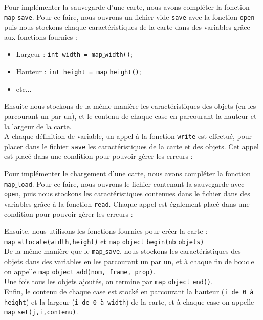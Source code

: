 \documentclass[a4paper, 12pt]{article}
\begin{document}
Pour implémenter la sauvegarde d'une carte, nous avons compléter la fonction \texttt{map$\_$save}.
Pour ce faire, nous ouvrons un fichier vide \texttt{save} avec la fonction \texttt{open} puis nous stockons chaque caractéristiques de la carte dans des variables grâce aux fonctions fournies :
\begin{itemize}
	\item Largeur : \texttt{int width = map$\_$width()};
	\item Hauteur : \texttt{int height = map$\_$height()};
	\item etc...
\end{itemize}
Ensuite nous stockons de la même manière les caractéristiques des objets (en les parcourant un par un), et le contenu de chaque case en parcourant la hauteur et la largeur de la carte. \\
A chaque définition de variable, un appel à la fonction \texttt{write} est effectué, pour placer dans le fichier \texttt{save} les caractéristiques de la carte et des objets. Cet appel est placé dans une condition pour pouvoir gérer les erreurs :
 

Pour implémenter le chargement d'une carte, nous avons compléter la fonction \texttt{map$\_$load}. Pour ce faire, nous ouvrons le fichier contenant la sauvegarde avec \texttt{open}, puis nous stockons les caractéristiques contenues dans le fichier dans des variables grâce à la fonction \texttt{read}. Chaque appel est également placé dans une condition pour pouvoir gérer les erreurs :

Ensuite, nous utilisons les fonctions fournies pour créer la carte : \\
\texttt{map$\_$allocate(width,height)} et \texttt{map$\_$object$\_$begin(nb$\_$objets)}\\
De la même manière que le \texttt{map$\_$save}, nous stockons les caractéristiques des objets dans des variables en les parcourant un par un, et à chaque fin de boucle on appelle \texttt{map$\_$object$\_$add(nom, frame, prop)}. \\
Une fois tous les objets ajoutés, on termine par \texttt{map$\_$object$\_$end()}. \\
Enfin, le contenu de chaque case est stocké en parcourant la hauteur (\texttt{i de 0 à height}) et la largeur (\texttt{i de 0 à width}) de la carte, et à chaque case on appelle \texttt{map$\_$set(j,i,contenu)}. \\
\end{document}
